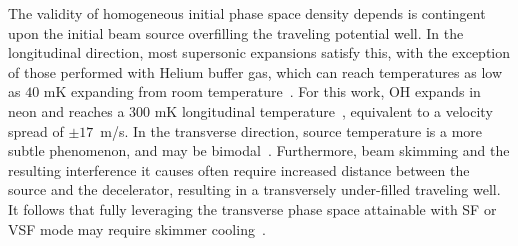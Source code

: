 \documentclass[%
 reprint,
 amsmath,amssymb,
 aps,
prl,
]{revtex4-1}
\begin{document}

The validity of homogeneous initial phase space density depends is contingent upon the initial beam source overfilling the traveling potential well.
In the longitudinal direction, most supersonic expansions satisfy this, with the exception of those performed with Helium buffer gas, which can reach temperatures as low as $40\text{ mK}$ expanding from room temperature~\cite{Even2014}.
For this work, OH expands in neon and reaches a $300\text{ mK}$ longitudinal temperature~\cite{Wu2018}, equivalent to a velocity spread of $\pm17$~m/s.
In the transverse direction, source temperature is a more subtle phenomenon, and may be bimodal~\cite{Beijerinck1981}.
Furthermore, beam skimming and the resulting interference it causes often require increased distance between the source and the decelerator, resulting in a transversely under-filled traveling well.
It follows that fully leveraging the transverse phase space attainable with SF or VSF mode may require skimmer cooling~\cite{Wu2018}.

\end{document}
